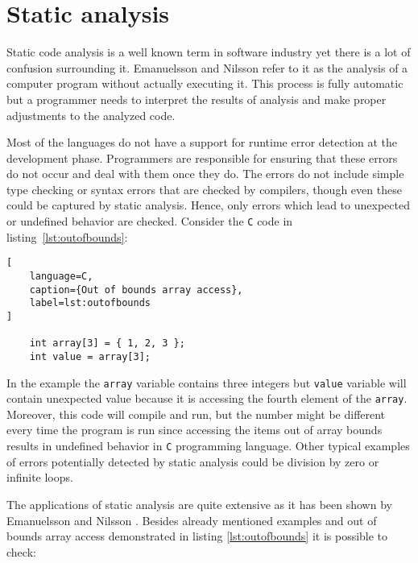 \documentclass[12pt,final,oneside]{fithesis2}
\theoremstyle{definition}
\begin{document}
\section{Static analysis}

Static code analysis is a well known term in software industry yet there
is a lot of confusion surrounding it. Emanuelsson and Nilsson
\cite{EmanuelssonNilsson08-1} refer to it as the analysis of a computer
program without actually executing it. This process is fully automatic
but a programmer needs to interpret the results of analysis and make
proper adjustments to the analyzed code.

Most of the languages do not have a support for runtime error detection at
the development phase. Programmers are responsible for ensuring that these
errors do not occur and deal with them once they do. The errors do not include
simple type checking or syntax errors that are checked by compilers, though
even these could be captured by static analysis. Hence, only
errors which lead to unexpected or undefined behavior are checked.
Consider the \texttt{C} code in listing~\ref{lst:outofbounds}:

\begin{lstlisting}[
    language=C,
    caption={Out of bounds array access},
    label=lst:outofbounds
]

    int array[3] = { 1, 2, 3 };
    int value = array[3];

\end{lstlisting}

In the example the \texttt{array} variable contains three integers but
\texttt{value} variable will contain unexpected value because it is
accessing the fourth element of the \texttt{array}. Moreover, this code will
compile and run, but the number might be different every
time the program is run since accessing the items out of array bounds results in
undefined behavior in \texttt{C} programming language. Other typical
examples of errors potentially detected by static analysis could be
division by zero or infinite loops.

The applications of static analysis are quite extensive as it has been
shown by Emanuelsson and Nilsson \cite{EmanuelssonNilsson08-1}. Besides
already mentioned examples and out of bounds array access demonstrated in
listing \ref{lst:outofbounds} it is possible to check:
\end{document}
